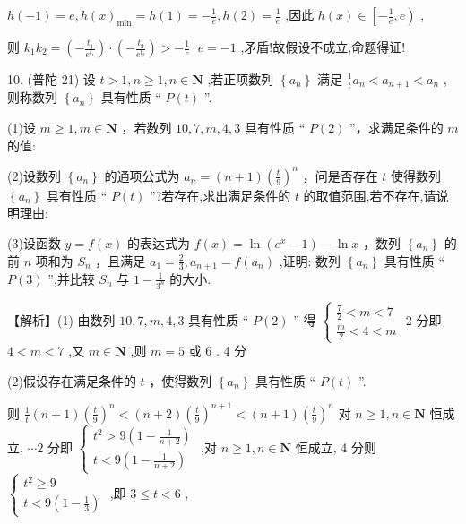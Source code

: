 \documentclass[10pt]{article}
\begin{document}
\(h\left( {-1}\right)  = e,h{\left( x\right) }_{\min } = h\left( 1\right)  =  - \frac{1}{e},h\left( 2\right)  = \frac{1}{e}\) ,因此 \(h\left( x\right)  \in  \left\lbrack  {-\frac{1}{e},e}\right)\) ,

则 \({k}_{1}{k}_{2} = \left( {-\frac{{t}_{1}}{{e}^{{t}_{1}}}}\right)  \cdot  \left( {-\frac{{t}_{2}}{{e}^{{t}_{2}}}}\right)  >  - \frac{1}{e} \cdot  e =  - 1\) ,矛盾!故假设不成立,命题得证!

10. (普陀 21) 设 \(t > 1,n \geq  1,n \in  \mathbf{N}\) ,若正项数列 \(\left\{  {a}_{n}\right\}\) 满足 \(\frac{1}{t}{a}_{n} < {a}_{n + 1} < {a}_{n}\) ,则称数列 \(\left\{  {a}_{n}\right\}\) 具有性质 “ \(P\left( t\right)\) ”.

(1)设 \(m \geq  1,m \in  \mathbf{N}\) ，若数列 \({10},7,m,4,3\) 具有性质 “ \(P\left( 2\right)\) ”，求满足条件的 \(m\) 的值:

(2)设数列 \(\left\{  {a}_{n}\right\}\) 的通项公式为 \({a}_{n} = \left( {n + 1}\right) {\left( \frac{t}{9}\right) }^{n}\) ，问是否存在 \(t\) 使得数列 \(\left\{  {a}_{n}\right\}\) 具有性质 “ \(P\left( t\right)\) ”?若存在,求出满足条件的 \(t\) 的取值范围,若不存在,请说明理由;

(3)设函数 \(y = f\left( x\right)\) 的表达式为 \(f\left( x\right)  = \ln \left( {{e}^{x} - 1}\right)  - \ln x\) ，数列 \(\left\{  {a}_{n}\right\}\) 的前 \(n\) 项和为 \({S}_{n}\) ，且满足 \({a}_{1} = \frac{2}{3},{a}_{n + 1} = f\left( {a}_{n}\right)\) ,证明: 数列 \(\left\{  {a}_{n}\right\}\) 具有性质 “ \(P\left( 3\right)\) ”,并比较 \({S}_{n}\) 与 \(1 - \frac{1}{{3}^{n}}\) 的大小.

【解析】(1) 由数列 \({10},7,m,4,3\) 具有性质 “ \(P\left( 2\right)\) ” 得 \(\left\{  \begin{array}{l} \frac{7}{2} < m < 7 \\  \frac{m}{2} < 4 < m \end{array}\right.\) 2 分即 \(4 < m < 7\) ,又 \(m \in  \mathbf{N}\) ,则 \(m = 5\) 或 6 . 4 分

(2)假设存在满足条件的 \(t\) ，使得数列 \(\left\{  {a}_{n}\right\}\) 具有性质 “ \(P\left( t\right)\) ”.

则 \(\frac{1}{t}\left( {n + 1}\right) {\left( \frac{t}{9}\right) }^{n} < \left( {n + 2}\right) {\left( \frac{t}{9}\right) }^{n + 1} < \left( {n + 1}\right) {\left( \frac{t}{9}\right) }^{n}\) 对 \(n \geq  1,n \in  \mathbf{N}\) 恒成立, \(\cdots 2\) 分即 \(\left\{  \begin{array}{l} {t}^{2} > 9\left( {1 - \frac{1}{n + 2}}\right) \\  t < 9\left( {1 - \frac{1}{n + 2}}\right)  \end{array}\right.\) ,对 \(n \geq  1,n \in  \mathbf{N}\) 恒成立, 4 分则 \(\left\{  \begin{array}{l} {t}^{2} \geq  9 \\  t < 9\left( {1 - \frac{1}{3}}\right)  \end{array}\right.\) ,即 \(3 \leq  t < 6\) ,
\end{document}
